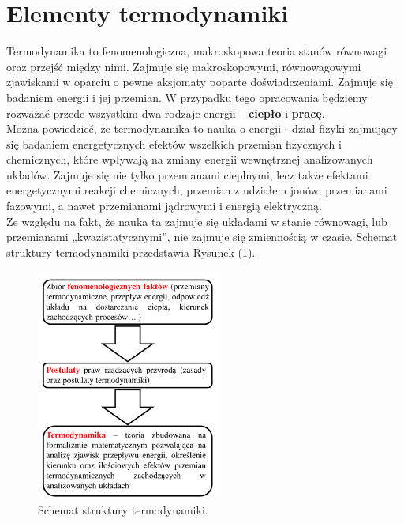 \documentclass[12pt,a4paper,openright]{report} %
\begin{document}
\section{Elementy termodynamiki}
Termodynamika to fenomenologiczna, makroskopowa teoria stanów równowagi oraz przejść między nimi. Zajmuje się makroskopowymi, równowagowymi zjawiskami w oparciu o pewne aksjomaty poparte doświadczeniami. Zajmuje się badaniem energii i jej przemian. W przypadku tego opracowania będziemy rozważać przede wszystkim dwa rodzaje energii – \textbf{ciepło} i \textbf{pracę}. \\ 
%
Można powiedzieć, że termodynamika to nauka o energii - dział fizyki zajmujący się badaniem energetycznych efektów wszelkich przemian fizycznych i chemicznych, które wpływają na zmiany energii wewnętrznej analizowanych układów. Zajmuje się nie tylko przemianami cieplnymi, lecz także efektami energetycznymi reakcji chemicznych, przemian z udziałem jonów, przemianami fazowymi, a nawet przemianami jądrowymi i energią elektryczną. \\ 
%
Ze względu na fakt, że nauka ta zajmuje się układami w stanie równowagi, lub przemianami „kwazistatycznymi”, nie zajmuje się zmiennością w czasie. Schemat struktury termodynamiki przedstawia Rysunek (\ref{1_sch_td}).
%
\begin{figure}[h!]
\centering
\includegraphics[width=6cm, clip]{rysunki/1_sch_td}
\caption{Schemat struktury termodynamiki.}
\label{1_sch_td}
\end{figure}
%
\end{document}
